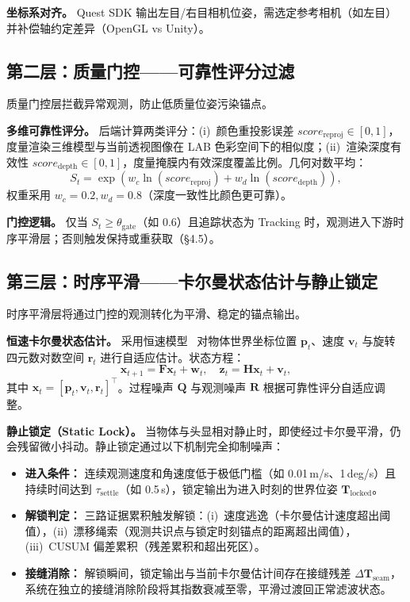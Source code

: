 \documentclass[review]{vgtc}
\begin{document}
\noindent\textbf{坐标系对齐。} Quest SDK 输出左目/右目相机位姿，需选定参考相机（如左目）并补偿轴约定差异（OpenGL vs Unity）。

\subsection{第二层：质量门控——可靠性评分过滤}

质量门控层拦截异常观测，防止低质量位姿污染锚点。

\noindent\textbf{多维可靠性评分。} 后端计算两类评分：(i)~颜色重投影误差 $\mathit{score}_{\text{reproj}} \in [0,1]$，度量渲染三维模型与当前透视图像在 LAB 色彩空间下的相似度；(ii)~渲染深度有效性 $\mathit{score}_{\text{depth}} \in [0,1]$，度量掩膜内有效深度覆盖比例。几何对数平均：
\begin{equation}
  S_t = \exp\!\left(w_c\ln(\mathit{score}_{\text{reproj}}) + w_d\ln(\mathit{score}_{\text{depth}})\right),
  \label{eq:reliability}
\end{equation}
权重采用 $w_c=0.2, w_d=0.8$（深度一致性比颜色更可靠）。

\noindent\textbf{门控逻辑。} 仅当 $S_t \geq \theta_{\text{gate}}$（如 0.6）且追踪状态为 Tracking 时，观测进入下游时序平滑层；否则触发保持或重获取（§4.5）。

\subsection{第三层：时序平滑——卡尔曼状态估计与静止锁定}

时序平滑层将通过门控的观测转化为平滑、稳定的锚点输出。

\noindent\textbf{恒速卡尔曼状态估计。} 采用恒速模型~\cite{kalman1960new} 对物体世界坐标位置 $\mathbf{p}_t$、速度 $\mathbf{v}_t$ 与旋转四元数对数空间 $\mathbf{r}_t$ 进行自适应估计。状态方程：
\begin{equation}
  \mathbf{x}_{t+1} = \mathbf{F}\mathbf{x}_t + \mathbf{w}_t, \quad \mathbf{z}_t = \mathbf{H}\mathbf{x}_t + \mathbf{v}_t,
\end{equation}
其中 $\mathbf{x}_t = [\mathbf{p}_t, \mathbf{v}_t, \mathbf{r}_t]^\top$。过程噪声 $\mathbf{Q}$ 与观测噪声 $\mathbf{R}$ 根据可靠性评分自适应调整。

\noindent\textbf{静止锁定（Static Lock）。} 当物体与头显相对静止时，即使经过卡尔曼平滑，仍会残留微小抖动。静止锁定通过以下机制完全抑制噪声：

\begin{itemize}[leftmargin=1.4em]
  \item \textbf{进入条件：} 连续观测速度和角速度低于极低门槛（如 0.01\,m/s、1\,deg/s）且持续时间达到 $\tau_{\text{settle}}$（如 0.5\,s），锁定输出为进入时刻的世界位姿 $\mathbf{T}_{\text{locked}}$。
  \item \textbf{解锁判定：} 三路证据累积触发解锁：(i)~速度逃逸（卡尔曼估计速度超出阈值），(ii)~漂移绳索（观测共识点与锁定时刻锚点的距离超出阈值），(iii)~CUSUM 偏差累积（残差累积和超出死区）。
  \item \textbf{接缝消除：} 解锁瞬间，锁定输出与当前卡尔曼估计间存在接缝残差 $\Delta\mathbf{T}_{\text{seam}}$，系统在独立的接缝消除阶段将其指数衰减至零，平滑过渡回正常滤波状态。
\end{itemize}
\end{document}
